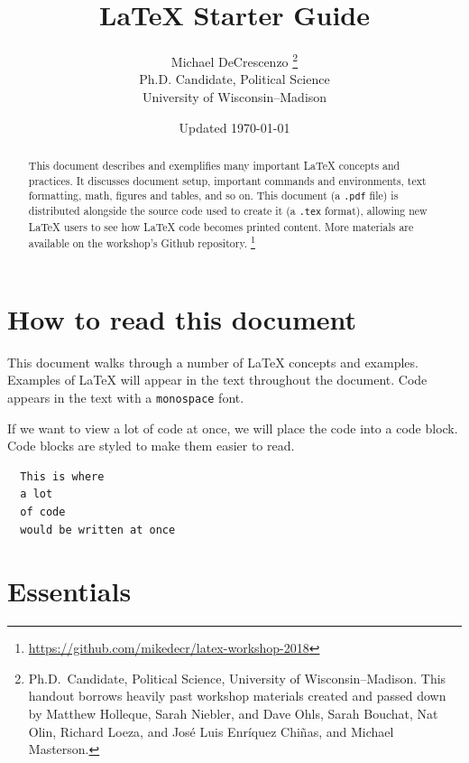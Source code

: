 \documentclass[12pt]{article}
\begin{document}
\title{{\LaTeX} Starter Guide}
\author{Michael DeCrescenzo%
        \thanks{Ph.D.\ Candidate, Political Science, University of Wisconsin--Madison. This handout borrows heavily past workshop materials created and passed down by Matthew Holleque, Sarah Niebler, and Dave Ohls, Sarah Bouchat, Nat Olin, Richard Loeza, and Jos\'e Luis Enr\'iquez Chi\~nas, and Michael Masterson.} \\ 
        Ph.D. Candidate, Political Science \\ 
        University of Wisconsin--Madison}
\date{Updated \today}
\maketitle


\begin{abstract}
  This document describes and exemplifies many important {\LaTeX} concepts and practices. It discusses document setup, important commands and environments, text formatting, math, figures and tables, and so on. This document (a \lstinline{.pdf} file) is distributed alongside the source code used to create it (a \lstinline{.tex} format), allowing new {\LaTeX} users to see how {\LaTeX} code becomes printed content. More materials are available on the workshop's Github repository.%
    \footnote{\url{https://github.com/mikedecr/latex-workshop-2018}}
\end{abstract}



\section{How to read this document}

This document walks through a number of {\LaTeX} concepts and examples. Examples of {\LaTeX} will appear in the text throughout the document. Code appears in the text with a \lstinline{monospace} font.

If we want to view a lot of code at once, we will place the code into a code block. Code blocks are styled to make them easier to read. 


\begin{lstlisting}
  This is where
  a lot
  of code
  would be written at once
\end{lstlisting}



\section{Essentials}
\end{document}
